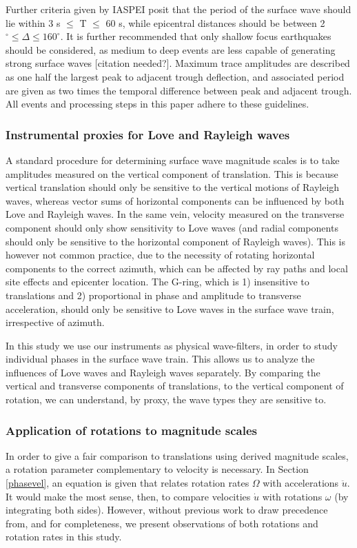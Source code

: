 \documentclass{gji}
\begin{document}
Further criteria given by IASPEI posit that the period of the surface wave should lie within 3 s $\le$ T $\le$ 60 s, while epicentral distances should be between 2$^\circ \le \Delta \le 160^\circ$. It is further recommended that only shallow focus earthquakes should be considered, as medium to deep events are less capable of generating strong surface waves [citation needed?].
Maximum trace amplitudes are described as one half the largest peak to adjacent trough deflection, and associated period are given as two times the temporal difference between peak and adjacent trough. All events and processing steps in this paper adhere to these guidelines.

\subsubsection{Instrumental proxies for Love and Rayleigh waves}\label{proxy}
A standard procedure for determining surface wave magnitude scales is to take amplitudes measured on the vertical component of translation. This is because vertical translation should only be sensitive to the vertical motions of Rayleigh waves, whereas vector sums of horizontal components can be influenced by both Love and Rayleigh waves. In the same vein, velocity measured on the transverse component should only show sensitivity to Love waves (and radial components should only be sensitive to the horizontal component of Rayleigh waves). This is however not common practice, due to the necessity of rotating horizontal components to the correct azimuth, which can be affected by ray paths and local site effects and epicenter location. The G-ring, which is 1) insensitive to translations and 2) proportional in phase and amplitude to transverse acceleration, should only be sensitive to Love waves in the surface wave train, irrespective of azimuth.  

In this study we use our instruments as physical wave-filters, in order to study individual phases in the surface wave train. This allows us to analyze the influences of Love waves and Rayleigh waves separately. By comparing the vertical and transverse components of translations, to the vertical component of rotation, we can understand, by proxy, the wave types they are sensitive to.

\subsubsection{Application of rotations to magnitude scales}
In order to give a fair comparison to translations using derived magnitude scales, a rotation parameter complementary to velocity is necessary. In Section \ref{phasevel}, an equation is given that relates rotation rates $\Omega$ with accelerations $\ddot{u}$. It would make the most sense, then, to compare velocities $\dot{u}$ with rotations $\omega$ (by integrating both sides). However, without previous work to draw precedence from, and for completeness, we present observations of both rotations and rotation rates in this study.
\end{document}
